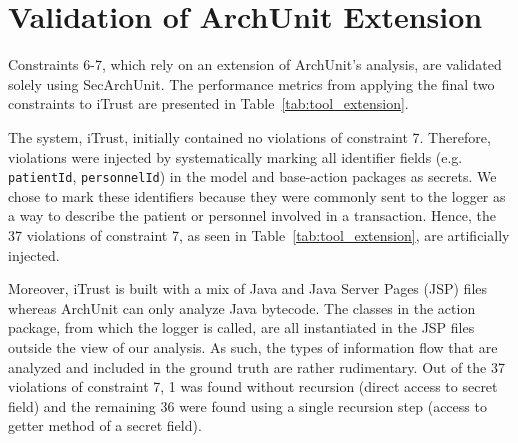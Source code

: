 

\section{Validation of ArchUnit Extension}
Constraints 6-7, which rely on an extension of ArchUnit's analysis, are validated solely using SecArchUnit. The performance metrics from applying the final two constraints to iTrust are presented in Table~\ref{tab:tool_extension}.

The system, iTrust, initially contained no violations of constraint 7. Therefore, violations were injected by systematically marking all identifier fields (e.g. \texttt{patientId}, \texttt{personnelId}) in the model and base-action packages as secrets. We chose to mark these identifiers because they were commonly sent to the logger as a way to describe the patient or personnel involved in a transaction. Hence, the 37 violations of constraint 7, as seen in Table~\ref{tab:tool_extension}, are artificially injected.

Moreover, iTrust is built with a mix of Java and Java Server Pages (JSP) files whereas ArchUnit can only analyze Java bytecode. The classes in the action package, from which the logger is called, are all instantiated in the JSP files outside the view of our analysis. As such, the types of information flow that are analyzed and included in the ground truth are rather rudimentary. Out of the 37 violations of constraint 7, 1 was found without recursion (direct access to secret field) and the remaining 36 were found using a single recursion step (access to getter method of a secret field).

